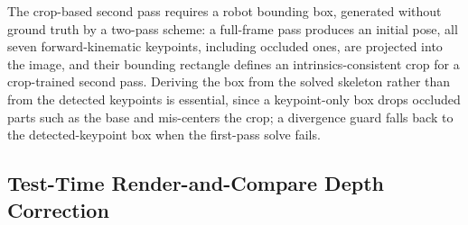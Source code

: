 The crop-based second pass requires a robot bounding box, generated without ground truth by a two-pass scheme: a full-frame pass produces an initial pose, all seven forward-kinematic keypoints, including occluded ones, are projected into the image, and their bounding rectangle defines an intrinsics-consistent crop for a crop-trained second pass. Deriving the box from the solved skeleton rather than from the detected keypoints is essential, since a keypoint-only box drops occluded parts such as the base and mis-centers the crop; a divergence guard falls back to the detected-keypoint box when the first-pass solve fails.

\subsection{Test-Time Render-and-Compare Depth Correction}
\label{sec:rc}

